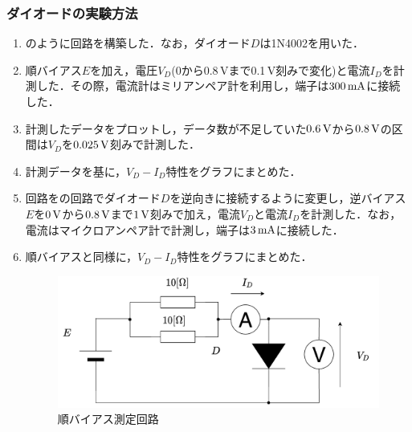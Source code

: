 \subsubsection{ダイオードの実験方法}
\begin{enumerate}[(1)]
	\item {}のように回路を構築した．なお，ダイオード$D$は1N4002を用いた．
	\item 順バイアス$E$を加え，電圧$V_{D}$(0から0.8\,\rm{V}まで0.1\,\rm{V}刻みで変化)と電流$I_{D}$を計測した．その際，電流計はミリアンペア計を利用し，端子は$300\,\rm{mA}$に接続した．
	\item 計測したデータをプロットし，データ数が不足していた$0.6\,\rm{V}$から$0.8\,\rm{V}$の区間は$V_{D}$を$0.025\,\rm{V}$刻みで計測した．
	\item 計測データを基に，$V_{D}-I_{D}$特性をグラフにまとめた．
	\item 回路をの回路でダイオード$D$を逆向きに接続するように変更し，逆バイアス$E$を$0\,\rm{V}$から$0.8\,\rm{V}$まで$1\,\rm{V}$刻みで加え，電流$V_{D}$と電流$I_{D}$を計測した．なお，電流はマイクロアンペア計で計測し，端子は$3\,\rm{mA}$に接続した．
	\item 順バイアスと同様に，$V_{D}-I_{D}$特性をグラフにまとめた．
	\begin{figure}[h]
	\centering
	\includegraphics[scale=0.65]{./fig/bias.pdf}
	\caption{順バイアス測定回路}
	\label{fig:bias}
	\end{figure}
\end{enumerate}

